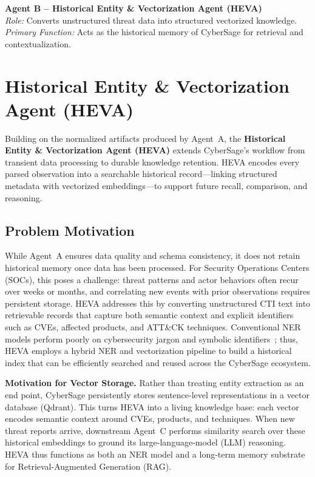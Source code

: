 \agentsectiongap
\begin{agentbox}
\textbf{Agent B – Historical Entity \& Vectorization Agent (HEVA)}\\
\textit{Role:} Converts unstructured threat data into structured vectorized knowledge.\\
\textit{Primary Function:} Acts as the historical memory of CyberSage for retrieval and contextualization.
\end{agentbox}

\section{Historical Entity \& Vectorization Agent (HEVA)}
\label{sec:agentB-heva}

\noindent
Building on the normalized artifacts produced by Agent~A, the \textbf{Historical Entity \& Vectorization Agent (HEVA)} extends CyberSage’s workflow from transient data processing to durable knowledge retention.  
HEVA encodes every parsed observation into a searchable historical record—linking structured metadata with vectorized embeddings—to support future recall, comparison, and reasoning.

\subsection{Problem Motivation}
While Agent~A ensures data quality and schema consistency, it does not retain historical memory once data has been processed.  
For Security Operations Centers (SOCs), this poses a challenge: threat patterns and actor behaviors often recur over weeks or months, and correlating new events with prior observations requires persistent storage.  
HEVA addresses this by converting unstructured CTI text into retrievable records that capture both semantic context and explicit identifiers such as CVEs, affected products, and ATT\&CK techniques.  
Conventional NER models perform poorly on cybersecurity jargon and symbolic identifiers~\cite{devlin2018bert, liu2019roberta, jehangir2023ner, keraghel2024ner}; thus, HEVA employs a hybrid NER and vectorization pipeline to build a historical index that can be efficiently searched and reused across the CyberSage ecosystem.


\textbf{Motivation for Vector Storage.}
Rather than treating entity extraction as an end point, CyberSage persistently stores sentence-level representations in a vector database (Qdrant). This turns HEVA into a living knowledge base: each vector encodes semantic context around CVEs, products, and techniques. When new threat reports arrive, downstream Agent~C performs similarity search over these historical embeddings to ground its large-language-model (LLM) reasoning. HEVA thus functions as both an NER model and a long-term memory substrate for Retrieval-Augmented Generation (RAG).


